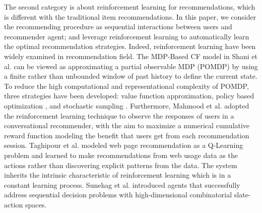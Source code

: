 The second category is about reinforcement learning for recommendations, which is different with the traditional item recommendations. In this paper, we consider the recommending procedure as sequential interactions between users and recommender agent; and leverage reinforcement learning to automatically learn the optimal recommendation strategies. Indeed, reinforcement learning have been widely examined in recommendation field. The MDP-Based CF model in Shani et al.\cite{shani2005mdp} can be viewed as approximating a partial observable MDP (POMDP) by using a finite rather than unbounded window of past history to define the current state. To reduce the high computational and representational complexity of POMDP, three strategies have been developed: value function approximation\cite{hauskrecht1997incremental}, policy based optimization \cite{ng2000pegasus,poupart2005vdcbpi}, and stochastic sampling \cite{kearns2002sparse}. Furthermore, Mahmood et al.\cite{mahmood2009improving} adopted the reinforcement learning technique to observe the responses of users in a conversational recommender, with the aim to maximize a numerical cumulative reward function modeling the benefit that users get from each recommendation session. Taghipour et al.\cite{taghipour2007usage,taghipour2008hybrid} modeled web page recommendation as a Q-Learning problem and learned to make recommendations from web usage data as the actions rather than discovering explicit patterns from the data. The system inherits the intrinsic characteristic of reinforcement learning which is in a constant learning process. Sunehag et al.\cite{sunehag2015deep} introduced agents that successfully address sequential decision problems with high-dimensional combinatorial slate-action spaces.  
